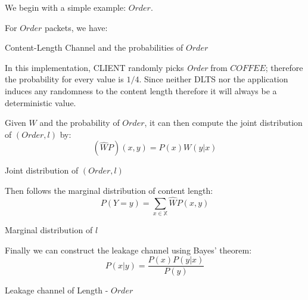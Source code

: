 \begin{example} \label{Exmp: Single-Order}
We begin with a simple example: $Order$.

For $Order$ packets, we have:

\begin{table}[H]
\begin{center}
{}
\end{center}
\caption{Content-Length Channel and the probabilities of $Order$}
\label{Tbl: Order1}
\end{table}

In this implementation, CLIENT randomly picks \textit{Order} from $COFFEE$; therefore the probability for every value is $1/4$. Since neither DLTS nor the application induces any randomness to the content length therefore it will always be a deterministic value.

Given $W$ and the probability of $Order$, it can then compute the joint distribution of $(Order, l)$ by:
\begin{equation}
(\widehat{W}P)(x,y) = P(x)W(y|x)
\end{equation}

\begin{table}[H]
\begin{center}
{}
\end{center}
\caption{Joint distribution of $(Order, l)$}
\label{Tbl: Order2}
\end{table}

Then follows the marginal distribution of content length:
\begin{equation}
P(Y=y) = \sum\limits_{x \in \mathbb{X}}{\widehat{W}P(x,y)}
\end{equation}

\begin{table}[H]
\begin{center}
{}
\end{center}
\caption{Marginal distribution of $l$}
\label{Tbl: Order3}
\end{table}

Finally we can construct the leakage channel using Bayes’ theorem:
\begin{equation}
P(x|y) = {\frac {P(x)P(y|x)} {P(y)}} 
\end{equation}
\begin{table}[H]
\begin{center}
{}
\end{center}
\caption{Leakage channel of Length - $Order$}
\label{Tbl: Order4}
\end{table}

\end{example}

